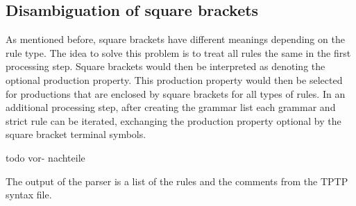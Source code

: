 \subsection{Disambiguation of  square brackets}\label{sec:ConceptDisambiguation}
As mentioned before, square brackets have different meanings depending on the rule type.
The idea to solve this problem is to treat all rules the same in the first processing step.
Square brackets would then be interpreted as denoting the optional production property.
This production property would then be selected for productions that are enclosed by square brackets for all types of rules.
In an additional processing step, after creating the grammar list each grammar and strict rule can be iterated, exchanging the production property optional by the square bracket terminal symbols.

todo vor- nachteile


The output of the parser is a list of the rules and the comments from the \ac{TPTP} syntax file.

